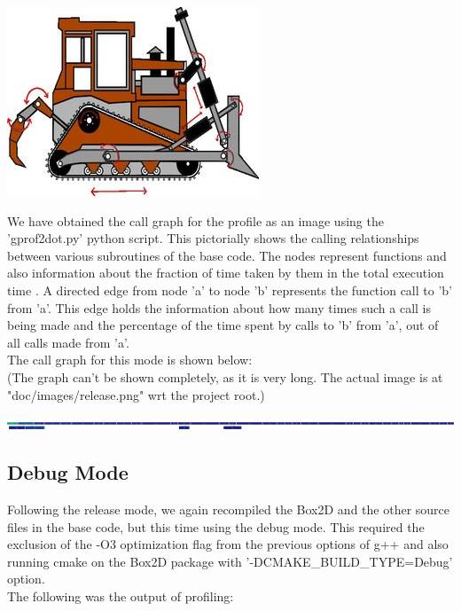 \documentclass[11pt]{article}
\begin{document}
\begin{center} 
\includegraphics [scale=1.1]{./images/original.jpg} 
\end{center}

We have obtained the call graph for the profile as an image using the 'gprof2dot.py' python script\cite{gprofcode}. This pictorially shows the calling relationships between various subroutines of the base code. The nodes represent functions and also information about the fraction of time taken by them in the total execution time . A directed edge from node 'a' to node 'b' represents the function call to 'b' from 'a'. This edge holds the information about how many times such a call is being made and the percentage of the time spent by calls to 'b' from 'a', out of all calls made from 'a'. \\
The call graph for this mode is shown below: \\
(The graph can't be shown completely, as it is very long. The actual image is at "doc/images/release.png" wrt the project root.)

\begin{center} 
\includegraphics [scale=0.04]{./images/release_100000.png}
\end{center}


\subsection{Debug Mode}
Following the release mode, we again recompiled the Box2D and the other source files in the base code, but this time using the debug mode. This required the exclusion of the -O3 optimization flag from the previous options of g++ and also running cmake on the Box2D package with '-DCMAKE\_BUILD\_TYPE=Debug' option. \\
The following was the output of profiling: \\ 
\end{document}
